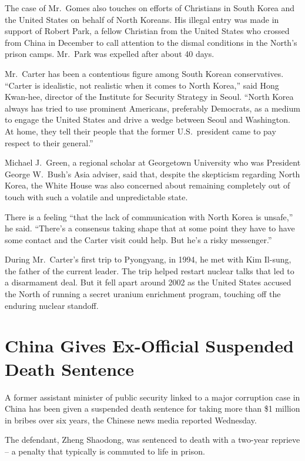 ﻿\documentclass[12pt]{article}
\begin{document}
The case of Mr.~Gomes also touches on efforts of Christians in South Korea and the United States on
behalf of North Koreans. His illegal entry was made in support of Robert Park, a fellow Christian
from the United States who crossed from China in December to call attention to the dismal conditions
in the North's prison camps. Mr.~Park was expelled after about 40 days.

Mr.~Carter has been a contentious figure among South Korean conservatives. ``Carter is idealistic,
not realistic when it comes to North Korea,'' said Hong Kwan-hee, director of the Institute for
Security Strategy in Seoul. ``North Korea always has tried to use prominent Americans, preferably
Democrats, as a medium to engage the United States and drive a wedge between Seoul and Washington.
At home, they tell their people that the former U.S.~president came to pay respect to their
general.''

Michael J.~Green, a regional scholar at Georgetown University who was President George W.~Bush's
Asia adviser, said that, despite the skepticism regarding North Korea, the White House was also
concerned about remaining completely out of touch with such a volatile and unpredictable state.

There is a feeling ``that the lack of communication with North Korea is unsafe,'' he said. ``There's
a consensus taking shape that at some point they have to have some contact and the Carter visit
could help. But he's a risky messenger.''

During Mr.~Carter's first trip to Pyongyang, in 1994, he met with Kim Il-sung, the father of the
current leader. The trip helped restart nuclear talks that led to a disarmament deal. But it fell
apart around 2002 as the United States accused the North of running a secret uranium enrichment
program, touching off the enduring nuclear standoff.

\pagebreak
\section{China Gives Ex-Official Suspended Death Sentence}

\lettrine{A}{} former assistant minister of public security linked to a
major corruption case in China has been given a suspended death sentence for taking more than \$1
million in bribes over six years, the Chinese news media reported Wednesday.

The defendant, Zheng Shaodong, was sentenced to death with a two-year reprieve -- a penalty that
typically is commuted to life in prison.
\end{document}
